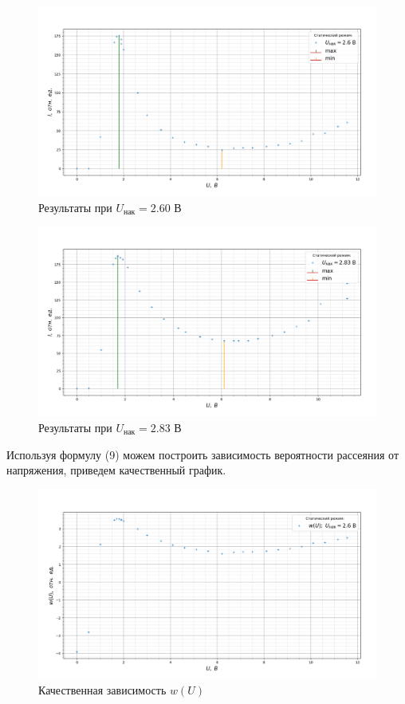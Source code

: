 \documentclass[a4paper,12pt]{article} %
\begin{document}
	\begin{figure}[H]
		\centering
		\includegraphics[width=0.85\linewidth]{graph_1}
		\caption{Результаты при $U_\text{нак} = 2.60$ В}
		\label{fig:graph1}
	\end{figure}
	\begin{figure}[H]
		\centering
		\includegraphics[width=0.85\linewidth]{graph_2}
		\caption{Результаты при $U_\text{нак} = 2.83$ В}
		\label{fig:graph2}
	\end{figure}
	Используя формулу (9) можем построить зависимость вероятности рассеяния от напряжения, приведем качественный график.
	\begin{figure}[H]
		\centering
		\includegraphics[width=0.85\linewidth]{graph_3}
		\caption{Качественная зависимость $w(U)$}
		\label{fig:graph3}
	\end{figure}
\end{document}
